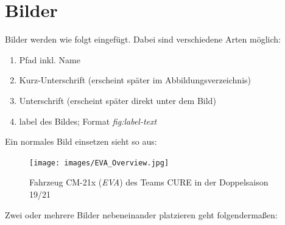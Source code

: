 
\chapter{Bilder}

Bilder werden wie folgt eingefügt. Dabei sind verschiedene Arten möglich:

\begin{enumerate}
    \item Pfad inkl. Name
    \item Kurz-Unterschrift (erscheint später im Abbildungsverzeichnis)
    \item Unterschrift (erscheint später direkt unter dem Bild)
    \item label des Bildes; Format \textit{fig:label-text}
\end{enumerate}

Ein normales Bild einsetzen sieht so aus:

\begin{figure}[h]
    \centering
    \vspace{12pt}
    \texttt{[image: images/EVA\_Overview.jpg]}
    \caption[Fahrzeug \glqq{}CM-21x\grqq{} ({\itshape EVA})]{Fahrzeug \glqq{}CM-21x\grqq{} ({\itshape EVA}) des Teams CURE in der Doppelsaison 19/21}
    \label{eva_overview}
\end{figure}

Zwei oder mehrere Bilder nebeneinander platzieren geht folgendermaßen:

